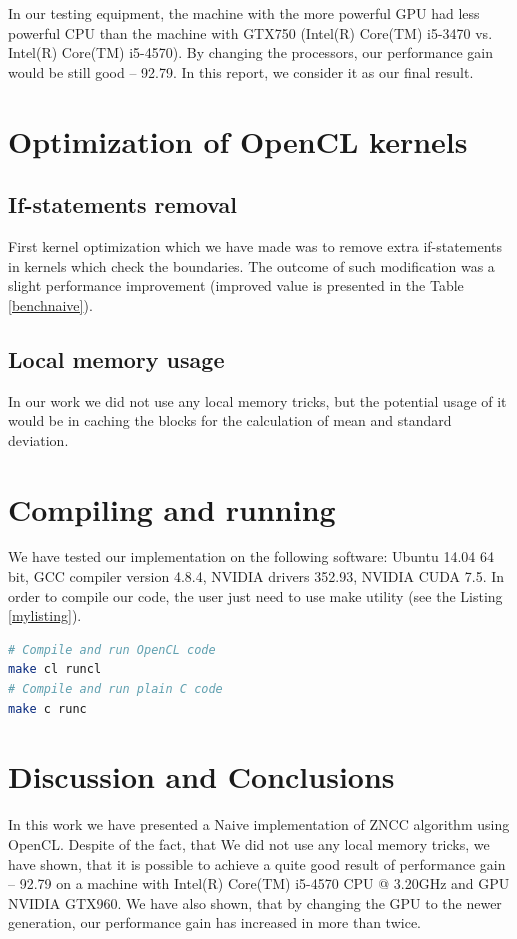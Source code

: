\documentclass[conference]{IEEEtran}
\begin{document}
In our testing equipment, the machine with the more powerful GPU had less powerful CPU than the machine with GTX750 (Intel(R) Core(TM) i5-3470 vs. Intel(R) Core(TM) i5-4570). By changing the processors, our performance gain would be still good -- 92.79. In this report, we consider it as our final result.

\section{Optimization of OpenCL kernels}
\subsection{If-statements removal}
First kernel optimization which we have made was to remove extra if-statements in kernels which check the boundaries. The outcome of such modification was a slight performance improvement (improved value is presented in the Table \ref{benchnaive}).

\subsection{Local memory usage}
In our work we did not use any local memory tricks, but the potential usage of it would be in caching the blocks for the calculation of mean and standard deviation.

\section{Compiling and running}
We have tested our implementation on the following software: Ubuntu 14.04 64 bit, GCC compiler version 4.8.4, NVIDIA drivers 352.93, NVIDIA CUDA 7.5. In order to compile our code, the user just need to use make utility (see the Listing \ref{mylisting}).

\begin{lstlisting}[language=bash,caption={Compiling commands},label={mylisting}]
# Compile and run OpenCL code
make cl runcl
# Compile and run plain C code
make c runc
\end{lstlisting}

\section{Discussion and Conclusions}
In this work we have presented a Naive implementation of ZNCC algorithm using OpenCL. Despite of the fact, that We did not use any local memory tricks, we have shown, that it is possible to  achieve a quite good result of performance gain -- 92.79 on a machine with Intel(R) Core(TM) i5-4570 CPU @ 3.20GHz and GPU NVIDIA GTX960. We have also shown, that by changing the GPU to the newer generation, our performance gain has increased in more than twice.



\end{document}

